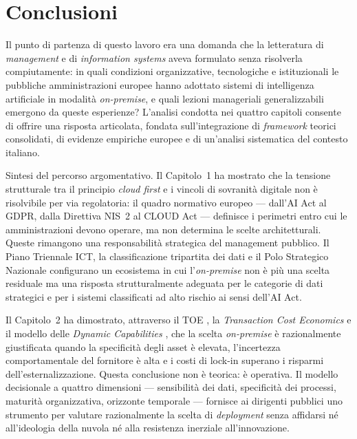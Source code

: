 \chapter*{Conclusioni}

Il punto di partenza di questo lavoro era una domanda che la letteratura di
\textit{management} e di \textit{information systems} aveva formulato senza risolverla
compiutamente: in quali condizioni organizzative, tecnologiche e istituzionali le
pubbliche amministrazioni europee hanno adottato sistemi di intelligenza artificiale
in modalità \textit{on-premise}, e quali lezioni manageriali generalizzabili emergono
da queste esperienze? L'analisi condotta nei quattro capitoli consente di offrire una
risposta articolata, fondata sull'integrazione di \textit{framework} teorici consolidati,
di evidenze empiriche europee e di un'analisi sistematica del contesto italiano.

\medskip

Sintesi del percorso argomentativo.
Il Capitolo~1 ha mostrato che la tensione strutturale tra il principio \textit{cloud
first} e i vincoli di sovranità digitale non è risolvibile per via regolatoria: il
quadro normativo europeo --- dall'AI Act al GDPR, dalla Direttiva NIS~2 al CLOUD Act
--- definisce i perimetri entro cui le amministrazioni devono operare, ma non
determina le scelte architetturali. Queste rimangono una responsabilità strategica del
management pubblico. Il Piano Triennale ICT, la classificazione tripartita dei dati e
il Polo Strategico Nazionale configurano un ecosistema in cui l'\textit{on-premise}
non è più una scelta residuale ma una risposta strutturalmente adeguata per le
categorie di dati strategici e per i sistemi classificati ad alto rischio ai sensi
dell'AI Act.

Il Capitolo~2 ha dimostrato, attraverso il TOE \parencite{TornatzkyFleischer1990},
la \textit{Transaction Cost Economics} \parencite{Williamson1985} e il modello delle
\textit{Dynamic Capabilities} \parencite{Teece2007}, che la scelta
\textit{on-premise} è razionalmente giustificata quando la specificità degli asset è
elevata, l'incertezza comportamentale del fornitore è alta e i costi di lock-in
superano i risparmi dell'esternalizzazione. Questa conclusione non è teorica: è
operativa. Il modello decisionale a quattro dimensioni --- sensibilità dei dati,
specificità dei processi, maturità organizzativa, orizzonte temporale --- fornisce ai
dirigenti pubblici uno strumento per valutare razionalmente la scelta di
\textit{deployment} senza affidarsi né all'ideologia della nuvola né alla resistenza
inerziale all'innovazione.

